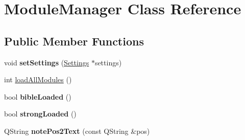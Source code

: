 \hypertarget{classModuleManager}{
\section{ModuleManager Class Reference}
\label{classModuleManager}
}
\subsection*{Public Member Functions}
\begin{DoxyCompactItemize}
\item 
\hypertarget{classModuleManager_a07c584d034796590403a62841fc19f8c}{
void {\bfseries setSettings} (\hyperlink{classSettings}{Settings} $\ast$settings)}
\label{classModuleManager_a07c584d034796590403a62841fc19f8c}

\item 
int \hyperlink{classModuleManager_a5ede22110fa3280a3b08638c91cbc026}{loadAllModules} ()
\item 
\hypertarget{classModuleManager_a755372af3684192ad9f980737da5cf14}{
bool {\bfseries bibleLoaded} ()}
\label{classModuleManager_a755372af3684192ad9f980737da5cf14}

\item 
\hypertarget{classModuleManager_a616a830690040b4076aecdde91b0f507}{
bool {\bfseries strongLoaded} ()}
\label{classModuleManager_a616a830690040b4076aecdde91b0f507}

\item 
\hypertarget{classModuleManager_a4eb718643caa54ac8fced7ff71e1df8c}{
QString {\bfseries notePos2Text} (const QString \&pos)}
\label{classModuleManager_a4eb718643caa54ac8fced7ff71e1df8c}

\end{DoxyCompactItemize}
